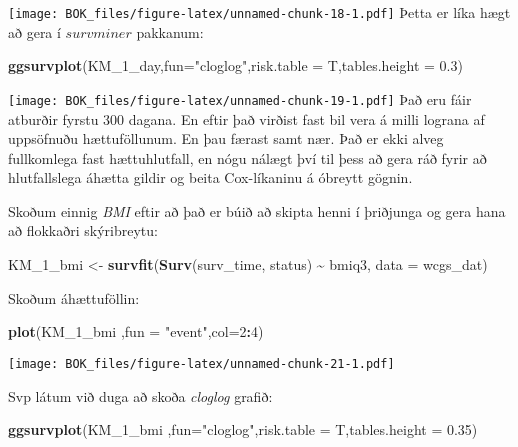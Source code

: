 \documentclass[
]{book}
\newenvironment{Shaded}{\begin{snugshade}}{\end{snugshade}}
\newcommand{\DataTypeTok}[1]{\textcolor[rgb]{0.13,0.29,0.53}{#1}}
\newcommand{\DecValTok}[1]{\textcolor[rgb]{0.00,0.00,0.81}{#1}}
\newcommand{\FloatTok}[1]{\textcolor[rgb]{0.00,0.00,0.81}{#1}}
\newcommand{\KeywordTok}[1]{\textcolor[rgb]{0.13,0.29,0.53}{\textbf{#1}}}
\newcommand{\NormalTok}[1]{#1}
\newcommand{\OperatorTok}[1]{\textcolor[rgb]{0.81,0.36,0.00}{\textbf{#1}}}
\newcommand{\StringTok}[1]{\textcolor[rgb]{0.31,0.60,0.02}{#1}}
\begin{document}
\texttt{[image: BOK\_files/figure-latex/unnamed-chunk-18-1.pdf]}
Þetta er líka hægt að gera í \(survminer\) pakkanum:

\begin{Shaded}
\begin{Highlighting}[]
\KeywordTok{ggsurvplot}\NormalTok{(KM\_}\DecValTok{1}\NormalTok{\_day,}\DataTypeTok{fun=}\StringTok{"cloglog"}\NormalTok{,}\DataTypeTok{risk.table =}\NormalTok{ T,}\DataTypeTok{tables.height =} \FloatTok{0.3}\NormalTok{)}
\end{Highlighting}
\end{Shaded}

\texttt{[image: BOK\_files/figure-latex/unnamed-chunk-19-1.pdf]}
Það eru fáir atburðir fyrstu 300 dagana. En eftir það virðist fast bil vera á milli lograna af uppsöfnuðu hættuföllunum. En þau færast samt nær. Það er ekki alveg fullkomlega fast hættuhlutfall, en nógu nálægt því til þess að gera ráð fyrir að hlutfallslega áhætta gildir og beita Cox-líkaninu á óbreytt gögnin.

Skoðum einnig \emph{BMI} eftir að það er búið að skipta henni í þriðjunga og gera hana að flokkaðri skýribreytu:

\begin{Shaded}
\begin{Highlighting}[]
\NormalTok{KM\_}\DecValTok{1}\NormalTok{\_bmi <{-}}\StringTok{ }\KeywordTok{survfit}\NormalTok{(}\KeywordTok{Surv}\NormalTok{(surv\_time, status) }\OperatorTok{\textasciitilde{}}\StringTok{ }\NormalTok{bmiq3, }\DataTypeTok{data =}\NormalTok{ wcgs\_dat)}
\end{Highlighting}
\end{Shaded}

Skoðum áhættuföllin:

\begin{Shaded}
\begin{Highlighting}[]
\KeywordTok{plot}\NormalTok{(KM\_}\DecValTok{1}\NormalTok{\_bmi ,}\DataTypeTok{fun =} \StringTok{"event"}\NormalTok{,}\DataTypeTok{col=}\DecValTok{2}\OperatorTok{:}\DecValTok{4}\NormalTok{)}
\end{Highlighting}
\end{Shaded}

\texttt{[image: BOK\_files/figure-latex/unnamed-chunk-21-1.pdf]}

Svp látum við duga að skoða \emph{cloglog} grafið:

\begin{Shaded}
\begin{Highlighting}[]
\KeywordTok{ggsurvplot}\NormalTok{(KM\_}\DecValTok{1}\NormalTok{\_bmi ,}\DataTypeTok{fun=}\StringTok{"cloglog"}\NormalTok{,}\DataTypeTok{risk.table =}\NormalTok{ T,}\DataTypeTok{tables.height =} \FloatTok{0.35}\NormalTok{)}
\end{Highlighting}
\end{Shaded}
\end{document}
